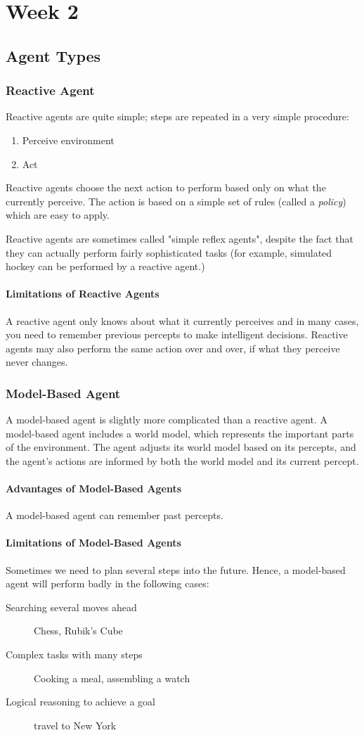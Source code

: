 \part{Week 2}
\chapter{Agent Types}
\section{Reactive Agent}
Reactive agents are quite simple; steps are repeated in a very simple
procedure:
\begin{enumerate}
    \item Perceive environment
    \item Act
\end{enumerate}
Reactive agents choose the next action to perform based only on what the
currently perceive. The action is based on a simple set of rules (called a
\textit{policy}) which are easy to apply.

Reactive agents are sometimes called "simple reflex agents", despite the fact
that they can actually perform fairly sophisticated tasks (for example,
simulated hockey can be performed by a reactive agent.)
\subsection{Limitations of Reactive Agents}
A reactive agent only knows about what it currently perceives and in many
cases, you need to remember previous percepts to make intelligent decisions.
Reactive agents may also perform the same action over and over, if what they
perceive never changes.

\section{Model-Based Agent}
A model-based agent is slightly more complicated than a reactive agent. A
model-based agent includes a world model, which represents the important parts
of the environment. The agent adjusts its world model based on its percepts,
and the agent's actions are informed by both the world model and its current
percept.
\subsection{Advantages of Model-Based Agents}
A model-based agent can remember past percepts.
\subsection{Limitations of Model-Based Agents}
Sometimes we need to plan several steps into the future. Hence, a model-based
agent will perform badly in the following cases:
\begin{description}
    \item[Searching several moves ahead] Chess, Rubik's Cube
    \item[Complex tasks with many steps] Cooking a meal, assembling a watch
    \item[Logical reasoning to achieve a goal] travel to New York
\end{description}

